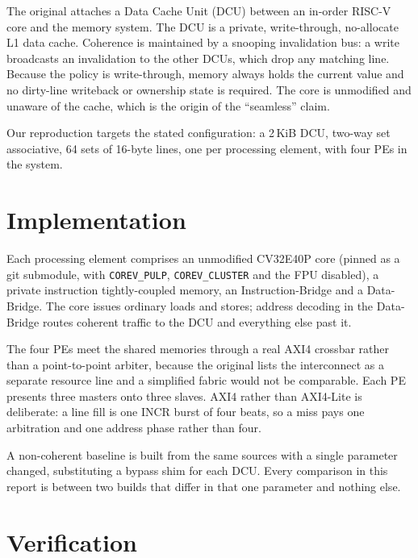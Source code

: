 \documentclass[conference]{IEEEtran}
\begin{document}
The original attaches a Data Cache Unit (DCU) between an in-order RISC-V core
and the memory system. The DCU is a private, write-through, no-allocate L1 data
cache. Coherence is maintained by a snooping invalidation bus: a write broadcasts
an invalidation to the other DCUs, which drop any matching line. Because the
policy is write-through, memory always holds the current value and no dirty-line
writeback or ownership state is required. The core is unmodified and unaware of
the cache, which is the origin of the ``seamless'' claim.

Our reproduction targets the stated configuration: a 2\,KiB DCU, two-way set
associative, 64 sets of 16-byte lines, one per processing element, with four PEs
in the system.

\section{Implementation}

Each processing element comprises an unmodified CV32E40P core (pinned as a git
submodule, with \texttt{COREV\_PULP}, \texttt{COREV\_CLUSTER} and the FPU
disabled), a private instruction tightly-coupled memory, an
Instruction-Bridge and a Data-Bridge. The core issues ordinary loads and stores;
address decoding in the Data-Bridge routes coherent traffic to the DCU and
everything else past it.

The four PEs meet the shared memories through a real AXI4 crossbar rather than a
point-to-point arbiter, because the original lists the interconnect as a
separate resource line and a simplified fabric would not be comparable. Each PE
presents three masters onto three slaves. AXI4 rather than AXI4-Lite is
deliberate: a line fill is one INCR burst of four beats, so a miss pays one
arbitration and one address phase rather than four.

A non-coherent baseline is built from the same sources with a single parameter
changed, substituting a bypass shim for each DCU. Every comparison in this
report is between two builds that differ in that one parameter and nothing else.

\section{Verification}
\end{document}
